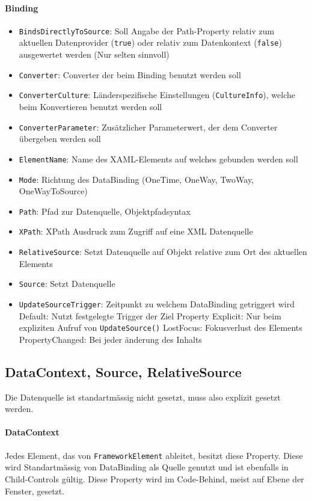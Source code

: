 \paragraph{Binding}
\begin{itemize}
    \item \verb+BindsDirectlyToSource+: Soll Angabe der Path-Property relativ zum aktuellen Datenprovider (\verb+true+) oder relativ zum Datenkontext (\verb+false+) ausgewertet werden (Nur selten sinnvoll)
    \item \verb+Converter+: Converter der beim Binding benutzt werden soll
    \item \verb+ConverterCulture+: Länderspezifische Einstellungen (\verb+CultureInfo+), welche beim Konvertieren benutzt werden soll
    \item \verb+ConverterParameter+: Zusätzlicher Parameterwert, der dem Converter übergeben werden soll
    \item \verb+ElementName+: Name des XAML-Elements auf welches gebunden werden soll
    \item \verb+Mode+: Richtung des DataBinding (OneTime, OneWay, TwoWay, OneWayToSource)
    \item \verb+Path+: Pfad zur Datenquelle, Objektpfadsyntax
    \item \verb+XPath+: XPath Ausdruck zum Zugriff auf eine XML Datenquelle
    \item \verb+RelativeSource+: Setzt Datenquelle auf Objekt relative zum Ort des aktuellen Elements
    \item \verb+Source+: Setzt Datenquelle
    \item \verb+UpdateSourceTrigger+: Zeitpunkt zu welchem DataBinding getriggert wird
        \subitem Default: Nutzt festgelegte Trigger der Ziel Property
        \subitem Explicit: Nur beim expliziten Aufruf von \verb+UpdateSource()+
        \subitem LostFocus: Fokusverlust des Elements
        \subitem PropertyChanged: Bei jeder änderung des Inhalts
\end{itemize}

\subsection{DataContext, Source, RelativeSource}
Die Datenquelle ist standartmässig nicht gesetzt, muss also explizit gesetzt werden. 
\paragraph{DataContext} Jedes Element, das von \verb+FrameworkElement+ ableitet, besitzt diese Property. Diese wird Standartmässig von DataBinding als Quelle genutzt und ist ebenfalls in Child-Controls gültig. Diese Property wird im Code-Behind, meist auf Ebene der Fenster, gesetzt.
